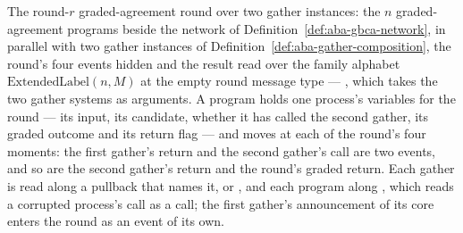 \begin{definition}
  \label{def:aba-round-composition}
  \leanok
  The round-$r$ graded-agreement round over two gather instances: the $n$ graded-agreement programs beside the network of Definition~\ref{def:aba-gbca-network}, in parallel with two gather instances of Definition~\ref{def:aba-gather-composition}, the round's four events hidden and the result read over the family alphabet $\mathrm{ExtendedLabel}(n, M)$ at the empty round message type --- , which takes the two gather systems as arguments.
  A program holds one process's variables for the round --- its input, its candidate, whether it has called the second gather, its graded outcome and its return flag --- and moves at each of the round's four moments: the first gather's return and the second gather's call are two events, and so are the second gather's return and the round's graded return.
  Each gather is read along a pullback that names it,  or , and each program along , which reads a corrupted process's call as a call; the first gather's announcement of its core enters the round as an event of its own.
\end{definition}
